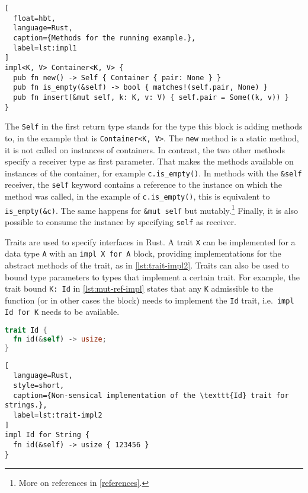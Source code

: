 \begin{lstlisting}[
  float=hbt,
  language=Rust,
  caption={Methods for the running example.},
  label=lst:impl1
]
impl<K, V> Container<K, V> {
  pub fn new() -> Self { Container { pair: None } }
  pub fn is_empty(&self) -> bool { matches!(self.pair, None) }
  pub fn insert(&mut self, k: K, v: V) { self.pair = Some((k, v)) }
}
\end{lstlisting}

The \lstinline!Self! in the first return type stands for the type this block is
adding methods to, in the example that is \lstinline!Container<K, V>!. The
\lstinline!new! method is a static method, it is not called on instances of
containers. In contrast, the two other methods specify a receiver type as first
parameter. That makes the methods available on instances of the container, for
example \lstinline!c.is_empty()!. In methods with the \lstinline!&self!
receiver, the \lstinline!self! keyword contains a reference to the instance on
which the method was called, in the example of \lstinline!c.is_empty()!, this is
equivalent to \lstinline!is_empty(&c)!. The same happens for
\passthrough{\lstinline!&mut self!} but mutably.\footnote{More on references in
\autoref{references}.} Finally, it is also possible to consume the instance by
specifying \lstinline!self! as receiver.

Traits are used to specify interfaces in Rust. A trait \lstinline!X! can be
implemented for a data type \lstinline!A! with an \passthrough{\lstinline!impl X
for A!} block, providing implementations for the abstract methods of the trait,
as in \autoref{lst:trait-impl2}. Traits can also be used to bound type
parameters to types that implement a certain trait. For example, the trait bound
\lstinline!K: Id!  in \autoref{lst:mut-ref-impl} states that any \lstinline!K!
admissible to the function (or in other cases the block) needs to implement the
\lstinline!Id! trait, i.e.~\passthrough{\lstinline!impl Id for K!} needs to be
available.

\noindent\begin{minipage}[t]{.48\textwidth}
\begin{lstlisting}[language=Rust, style=short, caption={Rust trait with one abstract method.}, label=lst:trait-impl1]
trait Id {
  fn id(&self) -> usize;
}
\end{lstlisting}
\end{minipage}\hfill
\begin{minipage}[t]{.48\textwidth}
\begin{lstlisting}[
  language=Rust,
  style=short,
  caption={Non-sensical implementation of the \texttt{Id} trait for strings.},
  label=lst:trait-impl2
]
impl Id for String {
  fn id(&self) -> usize { 123456 }
}
\end{lstlisting}
\end{minipage}

